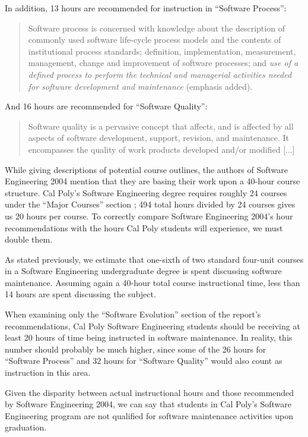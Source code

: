 \documentclass[11pt]{article}
\begin{document}
\begin{multicols}{2}
In addition, 13 hours are recommended for instruction in ``Software Process'':

\begin{quote}
Software process is concerned with knowledge about the description of commonly used software life-cycle process models and the contents of institutional process standards; definition, implementation, measurement, management, change and improvement of software processes; and \emph{use of a defined process to perform the technical and managerial activities needed for software development and maintenance} (emphasis added). \cite{se2004}
\end{quote}

And 16 hours are recommended for ``Software Quality'':

\begin{quote}
Software quality is a pervasive concept that affects, and is affected by all aspects of software development, support, revision, and maintenance. It encompasses the quality of work products developed and/or modified [...] \cite{se2004}
\end{quote}

While giving descriptions of potential course outlines, the authors of Software Engineering 2004 mention that they are basing their work upon a 40-hour course structure. \cite{se2004}  Cal Poly's Software Engineering degree requires roughly 24 courses under the ``Major Courses'' section \cite{catalogDegree}; 494 total hours divided by 24 courses gives us 20 hours per course.  To correctly compare Software Engineering 2004's hour recommendations with the hours Cal Poly students will experience, we must double them.

As stated previously, we estimate that one-sixth of two standard four-unit courses in a Software Engineering undergraduate degree is spent discussing software maintenance.  Assuming again a 40-hour total course instructional time, less than 14 hours are spent discussing the subject.

When examining only the ``Software Evolution'' section of the report's recommendations, Cal Poly Software Engineering students should be receiving at least 20 hours of time being instructed in software maintenance.  In reality, this number should probably be much higher, since some of the 26 hours for ``Software Process'' and 32 hours for ``Software Quality'' would also count as instruction in this area.

Given the disparity between actual instructional hours and those recommended by Software Engineering 2004, we can say that students in Cal Poly's Software Engineering program are not qualified for software maintenance activities upon graduation.


\end{multicols}
\end{document}
